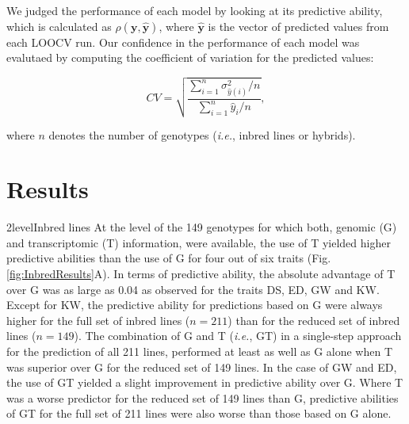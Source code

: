 \documentclass[12pt,titlepage]{article}
\begin{document}
We judged the performance of each model by looking at its predictive ability,
which is calculated as $\rho(\mathbf{y}, \mathbf{\hat{y}})$, where 
$\mathbf{\hat{y}}$ is the vector of predicted values from each LOOCV run.
Our confidence in the performance of each model was evalutaed by computing the
coefficient of variation for the predicted values:

\begin{equation} \label{eq:CV}
CV = \sqrt{\frac{\sum_{i = 1}^{n} \sigma^{2}_{\hat{y}(i)} / n}{\sum_{i=1}^{n}\hat{y}_{i} / n}},
\end{equation}

where $n$ denotes the number of genotypes (\textit{i.e.}, inbred lines or 
hybrids).












\section*{Results}
\Genetics2level{Inbred lines}
At the level of the 149 genotypes for which both, genomic (G) and 
transcriptomic (T) information, were available, the use of T yielded higher
predictive abilities than the use of G for four out of six traits
(Fig. \ref{fig:InbredResults}A).
In terms of predictive ability, the absolute advantage of T over G was as large 
as 0.04 as observed for the traits DS, ED, GW and KW.
Except for KW, the predictive ability for predictions based on G were always
higher for the full set of inbred lines ($n = 211$) than for the reduced set of 
inbred lines ($n = 149$).
The combination of G and T (\textit{i.e.}, GT) in a single-step approach for the 
prediction of all 211 lines, performed at least as well as G alone when T was 
superior over G for the reduced set of 149 lines.
In the case of GW and ED, the use of GT yielded a slight improvement in predictive 
ability over G.
Where T was a worse predictor for the reduced set of 149 lines than G,
predictive abilities of GT for the full set of 211 lines were also worse than 
those based on G alone.
\end{document}
